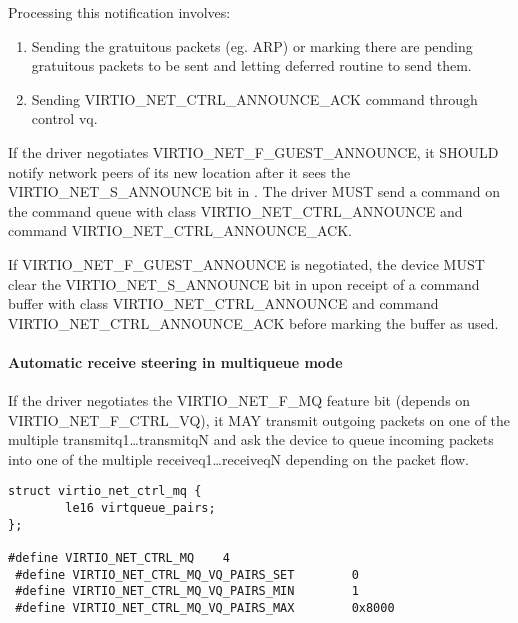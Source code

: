 Processing this notification involves:

\begin{enumerate}
\item Sending the gratuitous packets (eg. ARP) or marking there are pending
  gratuitous packets to be sent and letting deferred routine to
  send them.

\item Sending VIRTIO_NET_CTRL_ANNOUNCE_ACK command through control
  vq.
\end{enumerate}


If the driver negotiates VIRTIO_NET_F_GUEST_ANNOUNCE, it SHOULD notify
network peers of its new location after it sees the VIRTIO_NET_S_ANNOUNCE bit
in .  The driver MUST send a command on the command queue
with class VIRTIO_NET_CTRL_ANNOUNCE and command VIRTIO_NET_CTRL_ANNOUNCE_ACK.


If VIRTIO_NET_F_GUEST_ANNOUNCE is negotiated, the device MUST clear the
VIRTIO_NET_S_ANNOUNCE bit in  upon receipt of a command buffer
with class VIRTIO_NET_CTRL_ANNOUNCE and command VIRTIO_NET_CTRL_ANNOUNCE_ACK
before marking the buffer as used.

\paragraph{Automatic receive steering in multiqueue mode}\label{sec:Device Types / Network Device / Device Operation / Control Virtqueue / Automatic receive steering in multiqueue mode}

If the driver negotiates the VIRTIO_NET_F_MQ feature bit (depends
on VIRTIO_NET_F_CTRL_VQ), it MAY transmit outgoing packets on one
of the multiple transmitq1\ldots transmitqN and ask the device to
queue incoming packets into one of the multiple receiveq1\ldots receiveqN
depending on the packet flow.

\begin{lstlisting}
struct virtio_net_ctrl_mq {
        le16 virtqueue_pairs;
};

#define VIRTIO_NET_CTRL_MQ    4
 #define VIRTIO_NET_CTRL_MQ_VQ_PAIRS_SET        0
 #define VIRTIO_NET_CTRL_MQ_VQ_PAIRS_MIN        1
 #define VIRTIO_NET_CTRL_MQ_VQ_PAIRS_MAX        0x8000
\end{lstlisting}

